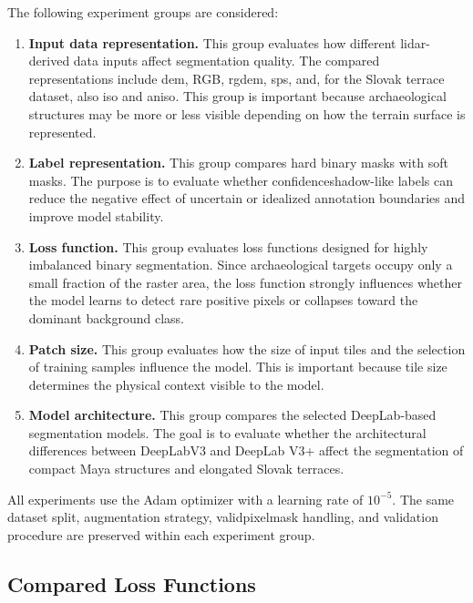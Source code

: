 The following experiment groups are considered:
\begin{enumerate}
    \item \textbf{Input data representation.} This group evaluates how different \gls{lidar}-derived data inputs affect segmentation quality. The compared representations include \gls{dem}, RGB, \gls{rgdem}, \gls{sps}, and, for the Slovak terrace dataset, also \gls{iso} and \gls{aniso}. This group is important because archaeological structures may be more or less visible depending on how the terrain surface is represented.

    \item \textbf{Label representation.} This group compares hard binary masks with soft masks. The purpose is to evaluate whether \gls{confidenceshadow}-like labels can reduce the negative effect of uncertain or idealized annotation boundaries and improve model stability.

    \item \textbf{Loss function.} This group evaluates loss functions designed for highly imbalanced binary segmentation. Since archaeological targets occupy only a small fraction of the raster area, the loss function strongly influences whether the model learns to detect rare positive pixels or collapses toward the dominant background class.

    \item \textbf{Patch size.} This group evaluates how the size of input tiles and the selection of training samples influence the model. This is important because tile size determines the physical context visible to the model.

    \item \textbf{Model architecture.} This group compares the selected DeepLab-based segmentation models. The goal is to evaluate whether the architectural differences between DeepLabV3 and DeepLab V3+ affect the segmentation of compact Maya structures and elongated Slovak terraces.
\end{enumerate}

All experiments use the Adam optimizer with a learning rate of $10^{-5}$. The same dataset split, augmentation strategy, \gls{validpixelmask} handling, and validation procedure are preserved within each experiment group.

\subsection{Compared Loss Functions}

